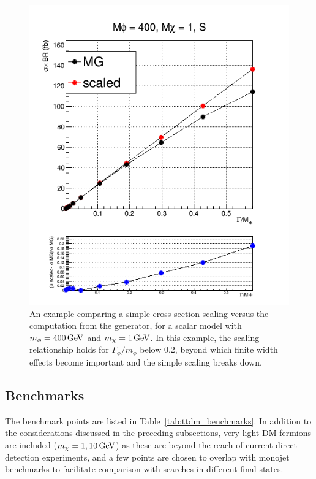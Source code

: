\begin{figure}[!ht]
\begin{center}
\includegraphics[scale=0.45]{figures/xVSwom_mphi_400_mchi_1_proc_S.png}
\vspace{2mm}
\caption{\label{fig:xsec_scaling} An example comparing a simple cross section scaling versus the computation from the generator, for a scalar model with $m_{\phi}=400\,{\rm GeV}$ and $m_{\chi}=1\,{\rm GeV}$. In this example, the scaling relationship holds for $\Gamma_{\phi}/m_{\phi}$ below $0.2$, beyond which finite width effects become important and the simple scaling breaks down.}
\end{center}
\end{figure}





\subsection{Benchmarks}
The benchmark points are listed in Table~\ref{tab:ttdm_benchmarks}. In addition to the considerations discussed in the preceding subsections, very light DM fermions are included ($m_{\chi}=1, 10\,{\rm GeV}$) as these are beyond the reach of current direct detection experiments, and a few points are chosen to overlap with monojet benchmarks to facilitate comparison with searches in different final states.



